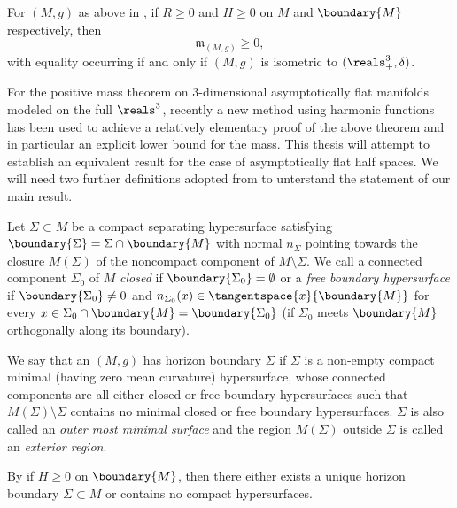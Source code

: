 \documentclass[titlepage,numbers=noenddot,headinclude,oneside,%
footinclude=true,cleardoublepage=empty,%
BCOR=5mm,paper=a4,fontsize=11pt,%
english,%
]{scrartcl}
\newcommand{\mass}[2]{\mathfrak{m}_{(#1,#2)}} %
\begin{document}
\begin{theorem}\label{thm:positive_mass_theorem_for_half_spaces}
    For \( (M,g) \) as above in , if \( R\geq 0 \) and \( H\geq 0 \) on \( M \) and \( \boundary{M} \) respectively, then
    \begin{equation*}
        \mass{M}{g}\geq 0,
    \end{equation*}  
    with equality occurring if and only if \( (M,g) \) is isometric to \( (\reals^3_+,\delta) \).
\end{theorem}
For the positive mass theorem on 3-dimensional asymptotically flat manifolds modeled on the full \( \reals^3 \), recently \parencite{brayHarmonicFunctionsMass2019} a new method using harmonic functions has been used to achieve a relatively elementary proof of the above theorem and in particular an explicit lower bound for the mass. This thesis will attempt to establish an equivalent result for the case of asymptotically flat half spaces. We will need two further definitions adopted from \cite{eichmairDoublingAsymptoticallyFlat2023} to unterstand the statement of our main result.
\begin{definition}
    Let \( \Sigma\subset M  \) be a compact separating hypersurface satisfying \( \boundary{\Sigma}=\Sigma\cap \boundary{M} \) with normal \( n_\Sigma \) pointing towards the closure \( M(\Sigma) \) of the noncompact component of \( M\setminus \Sigma \). We call a connected component \( \Sigma_0 \) of \( M \) \emph{closed} if \( \boundary{\Sigma_0}=\emptyset \) or a \emph{free boundary hypersurface} if \( \boundary{\Sigma_0}\neq 0 \) and \( n_{\Sigma_0}(x)\in \tangentspace{x}{\boundary{M}} \) for every \( x\in \Sigma_0\cap \boundary{M}=\boundary{\Sigma_0} \) (\ie if \( \Sigma_0 \) meets \( \boundary{M} \) orthogonally along its boundary).

    We say that an \( (M,g) \) has horizon boundary \( \Sigma \) if \( \Sigma \) is a non-empty compact minimal (\ie having zero mean curvature) hypersurface, whose connected components are all either closed or free boundary hypersurfaces such that \( M(\Sigma)\setminus \Sigma \) contains no minimal closed or free boundary hypersurfaces. \( \Sigma \) is also called an \emph{outer most minimal surface} and the region \( M(\Sigma) \) outside \( \Sigma \) is called an \emph{exterior region}.
\end{definition}
\begin{remark}
    By \cite[Lemma 2.3]{koerberRiemannianPenroseInequality2020} if \( H\geq 0 \) on \( \boundary{M} \), then there either exists a unique horizon boundary \( \Sigma\subset M \) or contains no compact hypersurfaces.
\end{remark}
\end{document}
